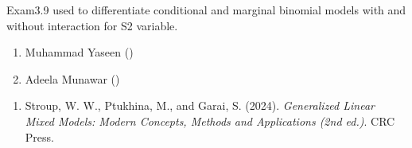 \documentclass[a4paper]{book}
\begin{document}
%
\begin{Description}
Exam3.9 used to differentiate conditional and marginal binomial models with and without interaction for S2 variable.
\end{Description}
%
\begin{Author}
\begin{enumerate}

\item{}  Muhammad Yaseen ()
\item{} Adeela Munawar ()

\end{enumerate}

\end{Author}
%
\begin{References}
\begin{enumerate}

\item{} Stroup, W. W., Ptukhina, M., and Garai, S. (2024).
\emph{Generalized Linear Mixed Models: Modern Concepts, Methods and Applications (2nd ed.)}.
CRC Press.

\end{enumerate}

\end{References}
%
\begin{SeeAlso}
\end{SeeAlso}
%
\end{document}

